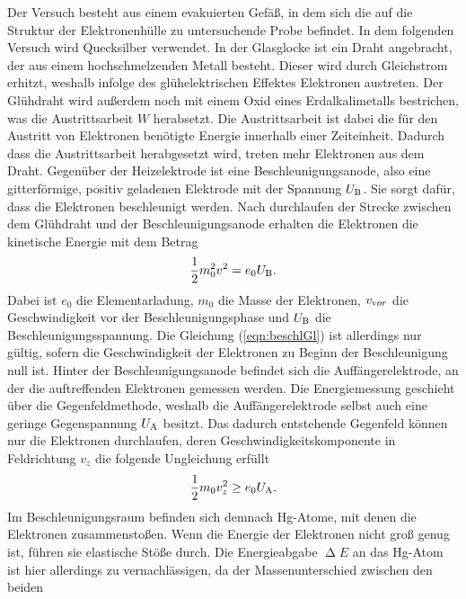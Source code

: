 \noindent
Der Versuch besteht aus einem evakuierten Gefäß, in dem sich die auf die Struktur der Elektronenhülle zu untersuchende Probe befindet. In dem folgenden Versuch wird Quecksilber verwendet.
In der Glasglocke ist ein Draht angebracht, der aus einem hochschmelzenden Metall besteht. Dieser wird durch Gleichstrom erhitzt, weshalb infolge des glühelektrischen Effektes Elektronen austreten.
Der Glühdraht wird außerdem noch mit einem Oxid eines Erdalkalimetalls bestrichen, was die Austrittsarbeit $W$ herabsetzt. Die Austrittsarbeit ist dabei die für den Austritt von Elektronen benötigte Energie innerhalb einer Zeiteinheit.
Dadurch dass die Austrittsarbeit herabgesetzt wird, treten mehr Elektronen aus dem Draht.
Gegenüber der Heizelektrode ist eine Beschleunigungsanode, also eine gitterförmige, positiv geladenen Elektrode mit der Spannung $U_{\text B}$. Sie sorgt dafür, dass die Elektronen beschleunigt werden. Nach durchlaufen der Strecke zwischen dem Glühdraht und der Beschleunigungsanode
erhalten die Elektronen die kinetische Energie mit dem Betrag
\begin{align}
    \frac 12 m_0^2 v^2 = e_0 U_{\text B}.
    \label{eqn:beschlGl}
\end{align}
Dabei ist $e_0$ die Elementarladung, $m_0$ die Masse der Elektronen, $v_{\text vor}$ 
die Geschwindigkeit vor der Beschleunigungsphase und $U_{\text B}$ die Beschleunigungsspannung.
Die Gleichung (\ref{eqn:beschlGl}) ist allerdings nur gültig, sofern die Geschwindigkeit der Elektronen zu Beginn der Beschleunigung null ist. \newline
Hinter der Beschleunigungsanode befindet sich die Auffängerelektrode, an der die auftreffenden Elektronen gemessen werden. Die Energiemessung geschieht über die Gegenfeldmethode, weshalb die Auffängerelektrode selbst auch eine geringe Gegenspannung $U_{\text A}$ besitzt.
Das dadurch entstehende Gegenfeld können nur die Elektronen durchlaufen, deren Geschwindigkeitskomponente in Feldrichtung $v_z$ die folgende Ungleichung erfüllt
\begin{align}
    \label{eqn:gegnFeldV}
    \frac 12 m_0 v_z^2 \geq e_0 U_{\text A}.
\end{align}
Im Beschleunigungsraum befinden sich demnach Hg-Atome, mit denen die Elektronen zusammenstoßen. Wenn die Energie der Elektronen nicht groß genug ist, führen sie elastische Stöße durch. Die Energieabgabe $\upDelta E$ an das Hg-Atom ist hier allerdings zu vernachlässigen, da der Massenunterschied zwischen den beiden
